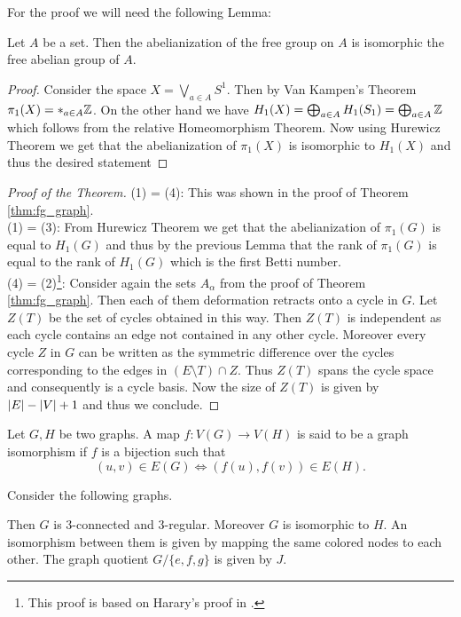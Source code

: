 For the proof we will need the following Lemma:
\begin{lemma}
	Let $A$ be a set. Then the abelianization of the free group on $A$ is isomorphic the free abelian group of $A$.
\end{lemma}

\begin{proof}
	Consider the space $X = \bigvee_{a \in A} S^{1}$. Then by Van Kampen's Theorem $\pi_1(X) = *_{a \in A} \mathbb{Z}$.
	On the other hand we have $H_1(X) = \bigoplus_{a \in A} H_1(S_1) = \bigoplus_{a \in A} \mathbb{Z}$ which follows from the relative Homeomorphism Theorem.
	Now using Hurewicz Theorem we get that the abelianization of $\pi_1(X)$ is isomorphic to $H_1(X)$ and thus the desired statement
\end{proof}

\begin{proof}[Proof of the Theorem]
	(1) = (4): This was shown in the proof of Theorem \ref{thm:fg_graph}.\\
	(1) = (3): From Hurewicz Theorem we get that the abelianization of $\pi_{1}(G)$ is equal to $H_{1}(G)$
	and thus by the previous Lemma that the rank of $\pi_1(G)$ is equal to the rank of $H_1(G)$ which is the first Betti number.\\
	(4) = (2)\footnote{This proof is based on Harary's proof in \cite[p. 37-40]{harary69}.}:
		Consider again the sets $A_{\alpha}$ from the proof of Theorem \ref{thm:fg_graph}. Then each of them deformation retracts onto a cycle in $G$.
	Let $Z(T)$ be the set of cycles obtained in this way. Then  $Z(T)$ is independent as each cycle contains an edge not contained in any other cycle.
	Moreover every cycle $Z$ in $G$ can be written as the symmetric difference over the cycles corresponding to the edges in $(E \setminus T) \cap Z$.
	Thus $Z(T)$ spans the cycle space and consequently is a cycle basis. Now the size of $Z(T)$ is given by $\abs{E} - \abs{V} + 1$ and thus we conclude.
\end{proof}

\begin{definition}
	Let $G,H$ be two graphs. A map $f: V(G) \to V(H)$ is said to be a graph isomorphism if $f$ is a bijection such that
	\[
		(u,v) \in E(G) \Leftrightarrow (f(u),f(v)) \in E(H)
	.\] 
\end{definition}

\begin{eg}\label{ex:gAuto}
	Consider the following graphs.

	Then $G$ is $3$-connected and $3$-regular. Moreover $G$ is isomorphic to $H$.
	An isomorphism between them is given by mapping the same colored nodes to each other.
	The graph quotient $G / \{e,f,g\}$ is given by $J$.
\end{eg}


